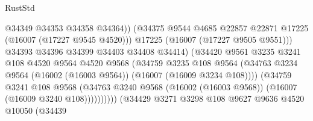 \begin{lexlean}{RustStd}
\begin{coremodule}
                                            @34349
                                            @34353
                                            @34358
                                            @34364))
                                        (@34375
                                          @9544
                                          @4685
                                          @22857
                                          @22871
                                          @17225
                                          (@16007 (@17227 @9545 @4520)))
                                        @17225
                                        (@16007 (@17227 @9505 @9551)))
                                      @34393
                                      @34396
                                      @34399
                                      @34403
                                      @34408
                                      @34414)
                                    (@34420
                                      @9561
                                      @3235
                                      @3241
                                      @108
                                      @4520
                                      @9564
                                      @4520
                                      @9568
                                      (@34759
                                        @3235
                                        @108
                                        @9564
                                        (@34763
                                          @3234
                                          @9564
                                          (@16002 (@16003 @9564))
                                          (@16007 (@16009 @3234 @108))))
                                      (@34759
                                        @3241
                                        @108
                                        @9568
                                        (@34763
                                          @3240
                                          @9568
                                          (@16002 (@16003 @9568))
                                          (@16007 (@16009 @3240 @108))))))))))
                          (@34429
                            @3271
                            @3298
                            @108
                            @9627
                            @9636
                            @4520
                            @10050
                            (@34439

\end{coremodule}
\end{lexlean}
